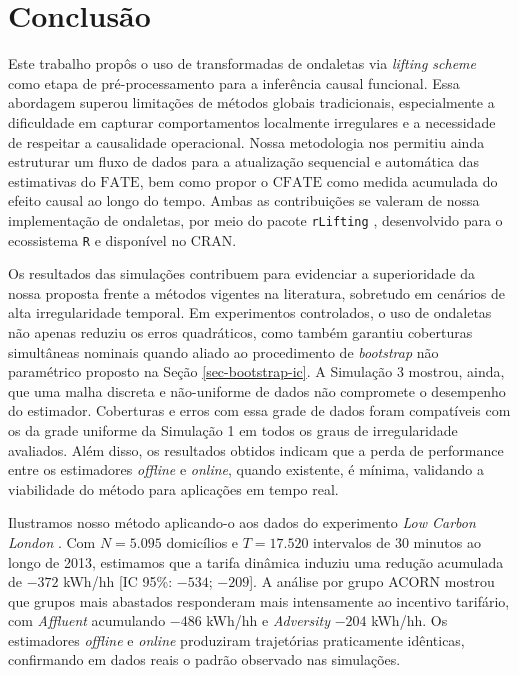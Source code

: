 \chapter[Conclusão]{Conclusão}\label{sec-conclusao}
Este trabalho propôs o uso de transformadas de ondaletas via \emph{lifting scheme} como etapa de pré-processamento para a inferência causal funcional. 
Essa abordagem superou limitações de métodos globais tradicionais, especialmente a dificuldade em capturar comportamentos localmente irregulares e a necessidade de respeitar a causalidade operacional. 
Nossa metodologia nos permitiu ainda estruturar um fluxo de dados para a atualização sequencial e automática das estimativas do \(\mathrm{FATE}\), bem como propor o \(\mathrm{CFATE}\) como medida acumulada do efeito causal ao longo do tempo. 
Ambas as contribuições se valeram de nossa implementação de ondaletas, por meio do pacote \texttt{rLifting} \cite{dasilvaRLiftingHighPerformanceWavelet2026}, desenvolvido para o ecossistema \texttt{R} e disponível no CRAN.

Os resultados das simulações contribuem para evidenciar a superioridade da nossa proposta frente a métodos vigentes na literatura, sobretudo em cenários de alta irregularidade temporal. 
Em experimentos controlados, o uso de ondaletas não apenas reduziu os erros quadráticos, como também garantiu coberturas simultâneas nominais quando aliado ao procedimento de \emph{bootstrap} não paramétrico proposto na Seção \ref{sec-bootstrap-ic}. 
A Simulação 3 mostrou, ainda, que uma malha discreta e não-uniforme de dados não compromete o desempenho do estimador. 
Coberturas e erros com essa grade de dados foram compatíveis com os da grade uniforme da Simulação 1 em todos os graus de irregularidade avaliados. 
Além disso, os resultados obtidos indicam que a perda de performance entre os estimadores \emph{offline} e \emph{online}, quando existente, é mínima, validando a viabilidade do método para aplicações em tempo real.

Ilustramos nosso método aplicando-o aos dados do experimento \emph{Low Carbon London} \cite{schofield2015lcl}.
Com \(N = 5.095\) domicílios e \(T = 17.520\) intervalos de 30 minutos ao longo de 2013, estimamos que a tarifa dinâmica induziu uma redução acumulada de \(-372\) kWh/hh [IC 95\%: \(-534\); \(-209\)].
A análise por grupo ACORN mostrou que grupos mais abastados responderam mais intensamente ao incentivo tarifário, com \emph{Affluent} acumulando \(-486\) kWh/hh e \emph{Adversity} \(-204\) kWh/hh.
Os estimadores \emph{offline} e \emph{online} produziram trajetórias praticamente idênticas, confirmando em dados reais o padrão observado nas simulações.

